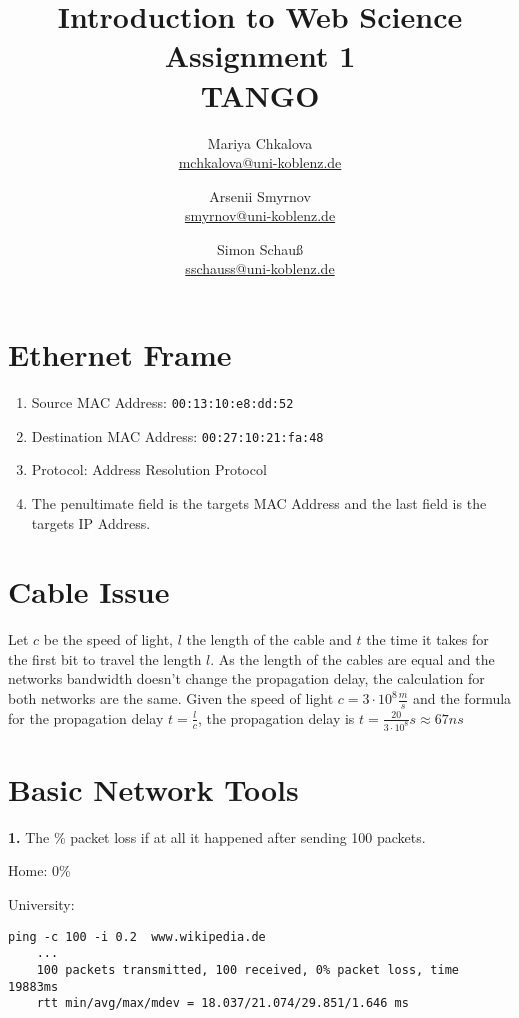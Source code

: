 \documentclass[12pt]{article}
\title{
	\Huge{Introduction to Web Science} \\
	\vspace{1em}
	\LARGE{Assignment 1} \\
	\vspace{1em}
	\Large{TANGO}
}
\author {
	Mariya Chkalova \\{\normalsize\href{mailto:mchkalova@uni-koblenz.de}{mchkalova@uni-koblenz.de}} \and
	Arsenii Smyrnov \\{\normalsize\href{mailto:smyrnov@uni-koblenz.de}{smyrnov@uni-koblenz.de}} \and
	Simon Schau\ss \\{\normalsize\href{mailto:sschauss@uni-koblenz.de}{sschauss@uni-koblenz.de}}
}
\date{}
\begin{document}
\maketitle
{}
\newpage


\section{Ethernet Frame}

\begin{enumerate}
	\item Source MAC Address: \texttt{00:13:10:e8:dd:52}
	\item Destination MAC Address: \texttt{00:27:10:21:fa:48}
	\item Protocol: Address Resolution Protocol 
	\item The penultimate field is the targets MAC Address and the last field is the targets IP Address.
\end{enumerate}

\section{Cable Issue}

Let $c$ be the speed of light, $l$ the length of the cable and $t$ the time it takes for the first bit to travel the length $l$. 
As the length of the cables are equal and the networks bandwidth doesn't change the propagation delay, the calculation for both networks are the same.  
Given the speed of light $c = 3 \cdot 10^8 \frac{m}{s}$ and the formula for the propagation delay $t = \frac{l}{c}$, the propagation delay is $t = \frac{20}{3 \cdot 10^8}s \approx 67ns$

\section{Basic Network Tools}

\lstset{breaklines=true, frame=single}

\textbf{1.} The \% packet loss if at all it happened after sending 100 packets.

Home: 0\%

University:

\begin{lstlisting}[caption=ping home]
	ping -c 100 -i 0.2  www.wikipedia.de
	...
	100 packets transmitted, 100 received, 0% packet loss, time 19883ms
	rtt min/avg/max/mdev = 18.037/21.074/29.851/1.646 ms
\end{lstlisting}
\end{document}
